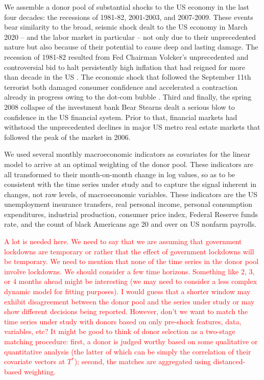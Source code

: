 \documentclass[11pt]{article}
\theoremstyle{definition}
\begin{document}
We assemble a donor pool of substantial shocks to the US economy in the last four decades: the recessions of 1981-82, 2001-2003, and 2007-2009. These events bear similarity to the broad, seismic shock dealt to the US economy in March 2020 -- and the labor market in particular --  not only due to their unprecedented nature but also because of their potential to cause deep and lasting damage.  The recession of 1981-82 resulted from Fed Chairman Volcker's unprecedented and controversial bid to halt persistently high inflation that had reigned for more than decade in the US \citep{sablik_2013}.  The economic shock that followed the September 11th terrorist both damaged consumer confidence and accelerated a contraction already in progress owing to the dot-com bubble \citep{kliesen_2003}.  Third and finally, the spring 2008 collapse of the investment bank Bear Stearns dealt a serious blow to confidence in the US financial system.  Prior to that, financial markets had withstood the unprecedented declines in major US metro real estate markets that followed the peak of the market in 2006.

We used several monthly macroeconomic indicators as covariates for the linear model to arrive at an optimal weighting of the donor pool.  These indicators are all transformed to their month-on-month change in log values, so as to be consistent with the time series under study and to capture the signal inherent in changes, not raw levels, of macroeconomic variables.  These indicators are the US unemployment insurance transfers, real personal income, personal consumption expenditures, industrial production, consumer price index, Federal Reserve funds rate, and the count of black Americans age 20 and over on US nonfarm payrolls.

\textcolor{red}{A lot is needed here. We need to say that we are assuming that government lockdowns are temporary or rather that the effect of government lockdowns will be temporary. We need to mention that none of the time series in the donor pool involve lockdowns. We should consider a few time horizons. Something like 2, 3, or 4 months ahead might be interesting (we may need to consider a less complex dynamic model for fitting purposes). I would guess that a shorter window may exhibit disagreement between the donor pool and the series under study or may show different decisions being reported. However, don't we want to match the time series under study with donors based on only pre-shock features, data, variables, etc?  It might be good to think of donor selection as a two-stage matching procedure: first, a donor is judged worthy based on some qualitative or quantitative analysis (the latter of which can be simply the correlation of their covariate vectors at $T^{*}$); second, the matches are aggregated using distanced-based weighting.}
\end{document}
